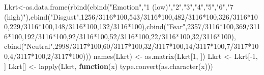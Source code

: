 \documentclass[
]{article}
\newenvironment{Shaded}{\begin{snugshade}}{\end{snugshade}}
\newcommand{\ControlFlowTok}[1]{\textcolor[rgb]{0.13,0.29,0.53}{\textbf{#1}}}
\newcommand{\DecValTok}[1]{\textcolor[rgb]{0.00,0.00,0.81}{#1}}
\newcommand{\FunctionTok}[1]{\textcolor[rgb]{0.00,0.00,0.00}{#1}}
\newcommand{\NormalTok}[1]{#1}
\newcommand{\OtherTok}[1]{\textcolor[rgb]{0.56,0.35,0.01}{#1}}
\newcommand{\SpecialCharTok}[1]{\textcolor[rgb]{0.00,0.00,0.00}{#1}}
\newcommand{\StringTok}[1]{\textcolor[rgb]{0.31,0.60,0.02}{#1}}
\begin{document}
\begin{Shaded}
\begin{Highlighting}[]
\NormalTok{Lkrt}\OtherTok{\textless{}{-}}\FunctionTok{as.data.frame}\NormalTok{(}\FunctionTok{rbind}\NormalTok{(}\FunctionTok{cbind}\NormalTok{(}\StringTok{"Emotion"}\NormalTok{,}\StringTok{"1 (low)"}\NormalTok{,}\StringTok{"2"}\NormalTok{,}\StringTok{"3"}\NormalTok{,}\StringTok{"4"}\NormalTok{,}\StringTok{"5"}\NormalTok{,}\StringTok{"6"}\NormalTok{,}\StringTok{"7 (high)"}\NormalTok{),}\FunctionTok{cbind}\NormalTok{(}\StringTok{"Disgust"}\NormalTok{,}\DecValTok{1256}\SpecialCharTok{/}\DecValTok{3116}\SpecialCharTok{*}\DecValTok{100}\NormalTok{,}\DecValTok{543}\SpecialCharTok{/}\DecValTok{3116}\SpecialCharTok{*}\DecValTok{100}\NormalTok{,}\DecValTok{482}\SpecialCharTok{/}\DecValTok{3116}\SpecialCharTok{*}\DecValTok{100}\NormalTok{,}\DecValTok{326}\SpecialCharTok{/}\DecValTok{3116}\SpecialCharTok{*}\DecValTok{100}\NormalTok{,}\DecValTok{229}\SpecialCharTok{/}\DecValTok{3116}\SpecialCharTok{*}\DecValTok{100}\NormalTok{,}\DecValTok{148}\SpecialCharTok{/}\DecValTok{3116}\SpecialCharTok{*}\DecValTok{100}\NormalTok{,}\DecValTok{132}\SpecialCharTok{/}\DecValTok{3116}\SpecialCharTok{*}\DecValTok{100}\NormalTok{),}\FunctionTok{cbind}\NormalTok{(}\StringTok{"Fear"}\NormalTok{,}\DecValTok{2357}\SpecialCharTok{/}\DecValTok{3116}\SpecialCharTok{*}\DecValTok{100}\NormalTok{,}\DecValTok{369}\SpecialCharTok{/}\DecValTok{3116}\SpecialCharTok{*}\DecValTok{100}\NormalTok{,}\DecValTok{192}\SpecialCharTok{/}\DecValTok{3116}\SpecialCharTok{*}\DecValTok{100}\NormalTok{,}\DecValTok{92}\SpecialCharTok{/}\DecValTok{3116}\SpecialCharTok{*}\DecValTok{100}\NormalTok{,}\DecValTok{52}\SpecialCharTok{/}\DecValTok{3116}\SpecialCharTok{*}\DecValTok{100}\NormalTok{,}\DecValTok{22}\SpecialCharTok{/}\DecValTok{3116}\SpecialCharTok{*}\DecValTok{100}\NormalTok{,}\DecValTok{32}\SpecialCharTok{/}\DecValTok{3116}\SpecialCharTok{*}\DecValTok{100}\NormalTok{), }\FunctionTok{cbind}\NormalTok{(}\StringTok{"Neutral"}\NormalTok{,}\DecValTok{2998}\SpecialCharTok{/}\DecValTok{3117}\SpecialCharTok{*}\DecValTok{100}\NormalTok{,}\DecValTok{60}\SpecialCharTok{/}\DecValTok{3117}\SpecialCharTok{*}\DecValTok{100}\NormalTok{,}\DecValTok{32}\SpecialCharTok{/}\DecValTok{3117}\SpecialCharTok{*}\DecValTok{100}\NormalTok{,}\DecValTok{14}\SpecialCharTok{/}\DecValTok{3117}\SpecialCharTok{*}\DecValTok{100}\NormalTok{,}\DecValTok{7}\SpecialCharTok{/}\DecValTok{3117}\SpecialCharTok{*}\DecValTok{100}\NormalTok{,}\DecValTok{4}\SpecialCharTok{/}\DecValTok{3117}\SpecialCharTok{*}\DecValTok{100}\NormalTok{,}\DecValTok{2}\SpecialCharTok{/}\DecValTok{3117}\SpecialCharTok{*}\DecValTok{100}\NormalTok{)))}
\FunctionTok{names}\NormalTok{(Lkrt) }\OtherTok{\textless{}{-}} \FunctionTok{as.matrix}\NormalTok{(Lkrt[}\DecValTok{1}\NormalTok{, ])}
\NormalTok{Lkrt }\OtherTok{\textless{}{-}}\NormalTok{ Lkrt[}\SpecialCharTok{{-}}\DecValTok{1}\NormalTok{, ]}
\NormalTok{Lkrt[] }\OtherTok{\textless{}{-}} \FunctionTok{lapply}\NormalTok{(Lkrt, }\ControlFlowTok{function}\NormalTok{(x) }\FunctionTok{type.convert}\NormalTok{(}\FunctionTok{as.character}\NormalTok{(x)))}


\end{Highlighting}
\end{Shaded}
\end{document}
